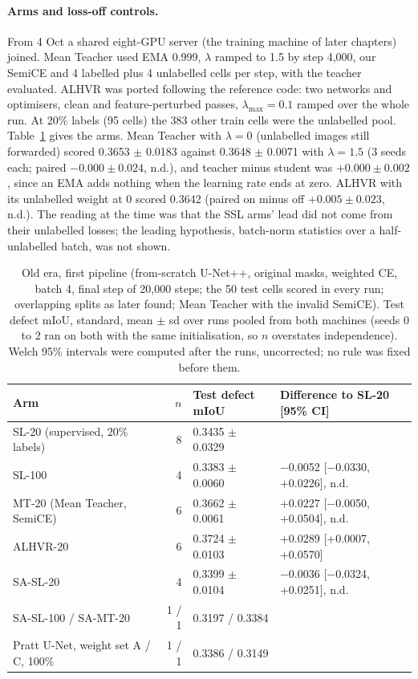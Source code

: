 \paragraph{Arms and loss-off controls.} From 4 Oct a shared eight-GPU server (the training machine of later chapters) joined.
Mean Teacher used EMA 0.999, $\lambda$ ramped to 1.5 by step 4,000, our SemiCE and 4 labelled plus 4 unlabelled cells per step, with
the teacher evaluated. ALHVR \citep{lei2025alhvr} was ported following the reference code: two networks and optimisers, clean and
feature-perturbed passes, $\lambda_{\max} = 0.1$ ramped over the whole run. At 20\% labels (95 cells) the 383 other train cells were
the unlabelled pool. Table~\ref{tab:repro-phase1} gives the arms. Mean Teacher with $\lambda = 0$ (unlabelled images still forwarded)
scored 0.3653 $\pm$ 0.0183 against 0.3648 $\pm$ 0.0071 with $\lambda = 1.5$ (3 seeds each; paired $-0.000 \pm 0.024$, n.d.), and
teacher minus student was $+0.000 \pm 0.002$, since an EMA adds nothing when the learning rate ends at zero. ALHVR with its unlabelled
weight at 0 scored 0.3642 (paired on minus off $+0.005 \pm 0.023$, n.d.). The reading at the time was that the SSL arms' lead did not
come from their unlabelled losses; the leading hypothesis, batch-norm statistics over a half-unlabelled batch, was not shown.

\begin{table}[htbp]
\centering
\footnotesize
\caption{Old era, first pipeline (from-scratch U-Net++, original masks, weighted CE, batch 4, final step of 20,000 steps; the 50
test cells scored in every run; overlapping splits as later found; Mean Teacher with the invalid SemiCE). Test defect mIoU, standard,
mean $\pm$ sd over runs pooled from both machines (seeds 0 to 2 ran on both with the same initialisation, so $n$ overstates
independence). Welch 95\% intervals were computed after the runs, uncorrected; no rule was fixed before them.}
\label{tab:repro-phase1}
\begin{tabular}{@{}lrll@{}}
\toprule
Arm & $n$ & Test defect mIoU & Difference to SL-20 [95\% CI] \\
\midrule
SL-20 (supervised, 20\% labels) & 8 & 0.3435 $\pm$ 0.0329 & \\
SL-100 & 4 & 0.3383 $\pm$ 0.0060 & $-$0.0052 [$-$0.0330, +0.0226], n.d. \\
MT-20 (Mean Teacher, SemiCE) & 6 & 0.3662 $\pm$ 0.0061 & +0.0227 [$-$0.0050, +0.0504], n.d. \\
ALHVR-20 & 6 & 0.3724 $\pm$ 0.0103 & +0.0289 [+0.0007, +0.0570] \\
SA-SL-20 & 4 & 0.3399 $\pm$ 0.0104 & $-$0.0036 [$-$0.0324, +0.0251], n.d. \\
SA-SL-100 / SA-MT-20 & 1 / 1 & 0.3197 / 0.3384 & \\
Pratt U-Net, weight set A / C, 100\% & 1 / 1 & 0.3386 / 0.3149 & \\
\bottomrule
\end{tabular}
\end{table}

